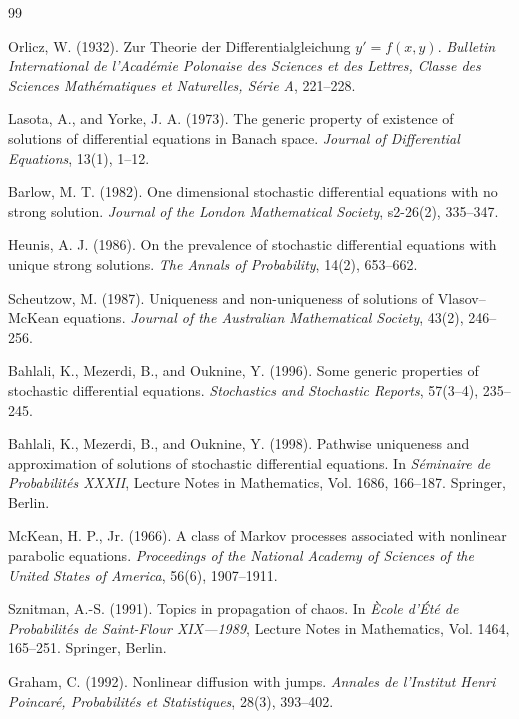 \documentclass[12pt,oneside, reqno]{amsart}
\numberwithin{equation}{section}
\begin{document}
	\begin{thebibliography}{99}
		
		Orlicz, W. (1932). Zur Theorie der Differentialgleichung $y'=f(x,y)$. {\it Bulletin International de l'Acad\'emie Polonaise des Sciences et des Lettres, Classe des Sciences Math\'ematiques et Naturelles, S\'erie A}, 221--228.
		
		Lasota, A., and Yorke, J. A. (1973). The generic property of existence of solutions of differential equations in Banach space. {\it Journal of Differential Equations}, 13(1), 1--12.
		
		Barlow, M. T. (1982). One dimensional stochastic differential equations with no strong solution. {\it Journal of the London Mathematical Society}, s2-26(2), 335--347.
		
		Heunis, A. J. (1986). On the prevalence of stochastic differential equations with unique strong solutions. {\it The Annals of Probability}, 14(2), 653--662.
		
		Scheutzow, M. (1987). Uniqueness and non-uniqueness of solutions of Vlasov--McKean equations. {\it Journal of the Australian Mathematical Society}, 43(2), 246--256.
		
		Bahlali, K., Mezerdi, B., and Ouknine, Y. (1996). Some generic properties of stochastic differential equations. {\it Stochastics and Stochastic Reports}, 57(3--4), 235--245.
		
		Bahlali, K., Mezerdi, B., and Ouknine, Y. (1998). Pathwise uniqueness and approximation of solutions of stochastic differential equations. In {\it S\'eminaire de Probabilit\'es XXXII}, Lecture Notes in Mathematics, Vol. 1686, 166--187. Springer, Berlin.
		
		McKean, H. P., Jr. (1966). A class of Markov processes associated with nonlinear parabolic equations. {\it Proceedings of the National Academy of Sciences of the United States of America}, 56(6), 1907--1911.
		
		Sznitman, A.-S. (1991). Topics in propagation of chaos. In {\it \`Ecole d'\'Et\'e de Probabilit\'es de Saint-Flour XIX---1989}, Lecture Notes in Mathematics, Vol. 1464, 165--251. Springer, Berlin.
		
		Graham, C. (1992). Nonlinear diffusion with jumps. {\it Annales de l'Institut Henri Poincar\'e, Probabilit\'es et Statistiques}, 28(3), 393--402.
		

\end{thebibliography}
\end{document}

